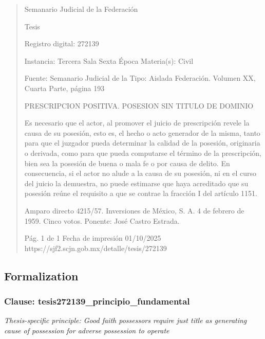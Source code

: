 \documentclass[11pt,a4paper]{article}
\begin{document}
\begin{quote}
                                                   Semanario Judicial de la Federación

                                                  Tesis

 Registro digital: 272139

 Instancia: Tercera Sala          Sexta Época                           Materia(s): Civil

                                  Fuente: Semanario Judicial de la      Tipo: Aislada
                                  Federación.
                                  Volumen XX, Cuarta Parte, página
                                  193


PRESCRIPCION POSITIVA. POSESION SIN TITULO DE DOMINIO


Es necesario que el actor, al promover el juicio de prescripción revele la causa de su posesión, esto
es, el hecho o acto generador de la misma, tanto para que el juzgador pueda determinar la calidad
de la posesión, originaria o derivada, como para que pueda computarse el término de la
prescripción, bien sea la posesión de buena o mala fe o por causa de delito. En consecuencia, si el
actor no alude a la causa de su posesión, ni en el curso del juicio la demuestra, no puede estimarse
que haya acreditado que su posesión reúne el requisito a que se contrae la fracción I del artículo
1151.


Amparo directo 4215/57. Inversiones de México, S. A. 4 de febrero de 1959. Cinco votos. Ponente:
José Castro Estrada.




                                             Pág. 1 de 1             Fecha de impresión 01/10/2025
  https://sjf2.scjn.gob.mx/detalle/tesis/272139

\end{quote}

\subsection{Formalization}

\subsubsection{Clause: tesis272139\_principio\_fundamental}

\textit{Thesis-specific principle: Good faith possessors require just title as generating cause of possession for adverse possession to operate}
\end{document}
